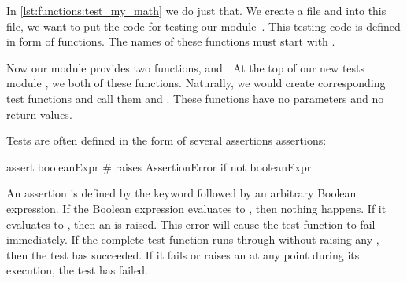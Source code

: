 %
%
%

In \cref{lst:functions:test_my_math} we do just that.
We create a file  and into this file, we want to put the code for testing our module~.
This testing code is defined in form of functions.
The names of these functions must start with .

Now our module  provides two functions,  and .
At the top of our new tests module , we  both of these functions.
Naturally, we would create corresponding test functions and call them  and .
These functions have no parameters and no return values.

Tests are often defined in the form of several assertions assertions:%
%
\begin{pythonSyntax}
assert booleanExpr  # raises AssertionError if not booleanExpr
\end{pythonSyntax}
%
An assertion is defined by the keyword  followed by an arbitrary Boolean expression.
If the Boolean expression evaluates to , then nothing happens.
If it evaluates to , then an  is raised.
This error will cause the test function to fail immediately.
If the complete test function runs through without raising any , then the test has succeeded.
If it fails or raises an  at any point during its execution, the test has failed.

